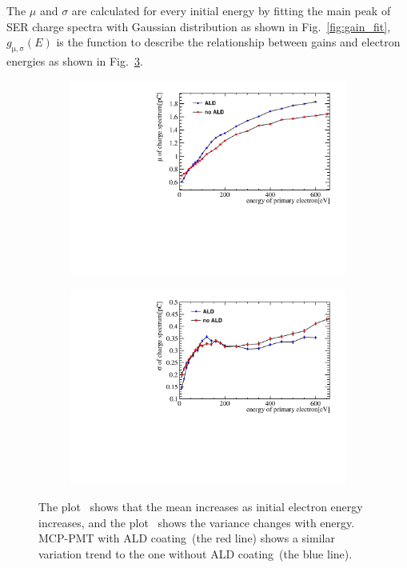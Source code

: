 The $\mu$ and $\sigma$ are calculated for every initial energy
by fitting the main peak of SER charge spectra with Gaussian distribution as shown in Fig.~\ref{fig:gain_fit},
$g_{\mathrm{\mu,\sigma}}(E)$ is the function to describe the relationship between gains and electron energies as shown in Fig.~\ref{fig:gaintest}.

\begin{figure}[ht]
    \centering
    \begin{subfigure}[b]{0.48\textwidth}
        \centering
        \includegraphics[width=\textwidth]{pic/gain.h5_mu.pdf}
        \caption{}
        \label{fig:gain}
    \end{subfigure}
    \hfill
    \begin{subfigure}[b]{0.48\textwidth}
        \centering
        \includegraphics[width=\textwidth]{pic/gain.h5_sigma.pdf}
        \caption{}
        \label{fig:sigma}
    \end{subfigure}
    \caption{The plot~ shows that the mean increases as initial electron energy increases,
        and the plot~ shows the variance changes with energy.
        MCP-PMT with ALD coating~(the red line) shows a similar variation trend to the one without ALD coating~(the blue line).}
    \label{fig:gaintest}
\end{figure}

